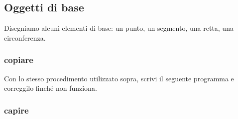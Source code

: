 \subsection{Oggetti di base}
\label{subsec:geo_int_oggetti_base}

Disegniamo alcuni elementi di base: un punto, un segmento, una retta, una 
circonferenza.

\subsubsection{copiare}

Con lo stesso procedimento utilizzato sopra, scrivi il seguente programma e 
correggilo finché non funziona.



\subsubsection{capire}


